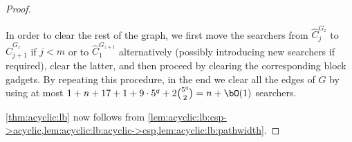\begin{proof}
\begin{nestedproof}
            In order to clear the rest of the graph, we first move the searchers from $\hat{C}^{G_z}_j$ to $\hat{C}^{G_z}_{j+1}$ if $j < m$
            or to $\hat{C}^{G_{z+1}}_1$ alternatively (possibly introducing new searchers if required),
            clear the latter, and then proceed by clearing the corresponding block gadgets.
            By repeating this procedure, in the end we clear all the edges of $G$ by using at most $1 + n + 17 + 1 + 9 \cdot 5^q + 2 \binom{5^q}{2} = n + \bO (1)$ searchers.
        \end{nestedproof}
%
%
        \cref{thm:acyclic:lb} now follows from \cref{lem:acyclic:lb:csp->acyclic,lem:acyclic:lb:acyclic->csp,lem:acyclic:lb:pathwidth}.
\end{proof}